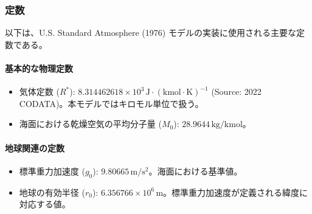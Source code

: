 \documentclass[a4paper,12pt]{article}
\begin{document}
\subsubsection{定数}
以下は、U.S. Standard Atmosphere (1976) モデルの実装に使用される主要な定数である。

\paragraph{基本的な物理定数}
\begin{itemize}
    \item 気体定数 ($R^*$): $8.314462618 \times 10^{3} \, \mathrm{J \cdot (kmol \cdot K)^{-1}}$ (Source: 2022 CODATA)。本モデルではキロモル単位で扱う。
    \item 海面における乾燥空気の平均分子量 ($M_0$): $28.9644 \, \mathrm{kg/kmol}$。
\end{itemize}

\paragraph{地球関連の定数}
\begin{itemize}
    \item 標準重力加速度 ($g_0$): $9.80665 \, \mathrm{m/s^2}$。海面における基準値。
    \item 地球の有効半径 ($r_0$): $6.356766 \times 10^6 \, \mathrm{m}$。標準重力加速度が定義される緯度に対応する値。
\end{itemize}
\end{document}
